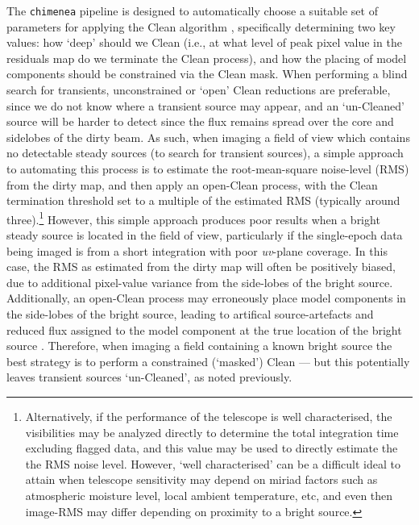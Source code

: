 \documentclass[5p,authoryear]{elsarticle}
\begin{document}
The \texttt{chimenea} pipeline is designed to automatically choose a suitable set of parameters for applying the Clean algorithm \citep{Hogbom1974,Schwab1984}, specifically determining two key values: how `deep' should we Clean (i.e., at what level of peak pixel value in the residuals map do we terminate the Clean process), and how the placing of model components should be constrained via the Clean mask. 
When performing a blind search for transients, unconstrained or `open' Clean reductions are preferable, since we do not know where a transient source may appear, and an `un-Cleaned' source will be harder to detect since the flux remains spread over the core and sidelobes of the dirty beam. 
As such, when imaging a field of view which contains no detectable steady sources (to search for transient sources), a simple approach to automating this process is to estimate the root-mean-square noise-level (RMS) from the dirty map, and then apply an open-Clean process, with the Clean termination threshold set to a multiple of the estimated RMS (typically around three).\footnote{%
Alternatively, if the performance of the telescope is well characterised, the visibilities may be analyzed directly to determine the total integration time excluding flagged data, and this value may be used to directly estimate the the RMS noise level. 
However, `well characterised' can be a difficult ideal to attain when telescope sensitivity may depend on miriad factors such as atmospheric moisture level, local ambient temperature, etc, and even then image-RMS may differ depending on proximity to a bright source.
}
However, this simple approach produces poor results when a bright steady source is located in the field of view, particularly if the single-epoch data being imaged is from a short integration with poor \textit{uv}-plane coverage.
In this case, the RMS as estimated from the dirty map will often be positively biased, due to additional pixel-value variance from the side-lobes of the bright source. 
Additionally, an open-Clean process may erroneously place model components in the side-lobes of the bright source, leading to artifical source-artefacts and reduced flux assigned to the model component at the true location of the bright source \citep[a phenomenon known as `clean bias', see e.g.][for details]{Condon1998,White1997}.
Therefore, when imaging a field containing a known bright source the best strategy is to perform a constrained (`masked') Clean --- but this potentially leaves transient sources `un-Cleaned', as noted previously. 
\end{document}

